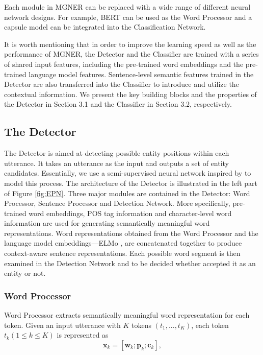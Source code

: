 \documentclass[11pt,a4paper]{article}
\newcommand{\ModelName}{\textsc{MGNER}}
\begin{document}
Each module in {\ModelName} can be replaced with a wide range of different neural network designs. For example, BERT \cite{devlin2018bert} can be used as the Word Processor and a capsule model \cite{sabour2017dynamic, xia2018zero} can be integrated into the Classification Network. 

It is worth mentioning that in order to improve the learning speed as well as the performance of {\ModelName}, the Detector and the Classifier are trained with a series of shared input features, including the pre-trained word embeddings and the pre-trained language model features.
Sentence-level semantic features trained in the Detector are also transferred into the Classifier to introduce and utilize the contextual information.
We present the key building blocks and the properties of the Detector in Section 3.1 and the Classifier in Section 3.2, respectively.

\subsection{The Detector}
The Detector is aimed at detecting possible entity positions within each utterance. It takes an utterance as the input and outputs a set of entity candidates.
Essentially, we use a semi-supervised neural network inspired by \cite{peters2017semi} to model this process. The architecture of the Detector is illustrated in the left part of Figure \ref{fig:EPN}. Three major modules are contained in the Detector: Word Processor, Sentence Processor and Detection Network. More specifically, pre-trained word embeddings, POS tag information and character-level word information are used for generating semantically meaningful word representations. Word representations obtained from the Word Processor and the language model embeddings---ELMo \cite{peters2018deep}, are concatenated together to produce context-aware sentence representations. Each possible word segment is then examined in the Detection Network and to be decided whether accepted it as an entity or not. 

\subsubsection{Word Processor}
Word Processor extracts semantically meaningful word representation for each token.
Given an input utterance with $K$ tokens $(t_{1}, ..., t_{K})$, each token $t_k (1\leq k \leq K)$ is represented as
\begin{equation*}
    \mathbf{x}_{k}= [ \mathbf{w}_{k}; \mathbf{p}_{k}; \mathbf{c}_{k}],
\end{equation*}\vspace{-1.5em}
\end{document}

